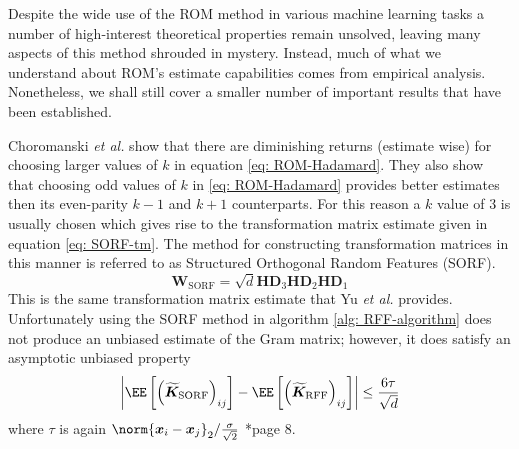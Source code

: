 Despite the wide use of the ROM method in various machine learning tasks \cite{ChoromanskiKrzysztof2017TUEo,AndoniAlexandr2015PaOL,ChoromanskiKrzysztof2020RAwP,LiuFanghui2021RFfK} a number of high-interest theoretical properties remain unsolved, leaving many aspects of this method shrouded in mystery. Instead, much of what we understand about ROM's estimate capabilities comes from empirical analysis. Nonetheless, we shall still cover a smaller number of important results that have been established.

Choromanski {\it et al.} \cite{ChoromanskiKrzysztof2017TUEo} show that there are diminishing returns (estimate wise) for choosing larger values of $k$ in equation \ref{eq: ROM-Hadamard}. They also show that choosing odd values of $k$ in \ref{eq: ROM-Hadamard} provides better estimates then its even-parity $k-1$ and $k+1$ counterparts. For this reason a $k$ value of $3$ is usually chosen which gives rise to the transformation matrix estimate given in equation \ref{eq: SORF-tm}. The method for constructing transformation matrices in this manner is referred to as Structured Orthogonal Random Features (SORF).
\begin{equation} \label{eq: SORF-tm}
    \bm{W}_{\text{SORF}} = \sqrt{d} \bm{H} \bm{D}_{3} \bm{H} \bm{D}_{2} \bm{H} \bm{D}_{1}
\end{equation}
This is the same transformation matrix estimate that Yu {\it et al.} provides. Unfortunately using the SORF method in algorithm \ref{alg: RFF-algorithm} does not produce an unbiased estimate of the Gram matrix; however, it does satisfy an asymptotic unbiased property
\begin{equation*}
    \left| \EE \left[ \left( \bm{\widetilde{K}}_{\text{SORF}} \right)_{ij} \right] - \EE \left[ \left( \bm{\widetilde{K}}_{\text{RFF}} \right)_{ij} \right] \right| \leq \frac{6 \tau}{\sqrt{d}}
\end{equation*}
where $\tau$ is again $\norm{\bm{x}_i - \bm{x}_j}_2 / \frac{\sigma}{\sqrt{2}}$ \cite{LiuFanghui2021RFfK}*{page 8}.

